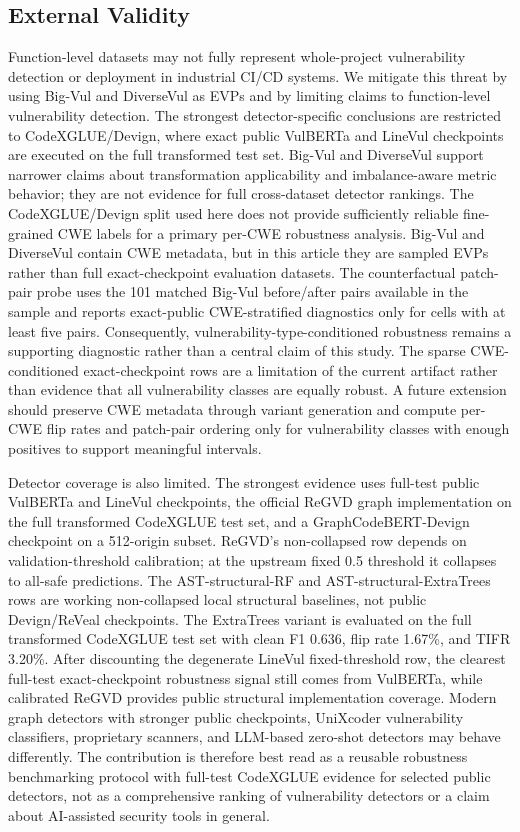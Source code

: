 \documentclass[a4paper,fleqn]{cas-dc}
\begin{document}
\subsection{External Validity}

Function-level datasets may not fully represent whole-project vulnerability
detection or deployment in industrial CI/CD systems. We mitigate this threat
by using Big-Vul and DiverseVul as EVPs and by limiting
claims to function-level vulnerability detection. The strongest
detector-specific conclusions are restricted to CodeXGLUE/Devign, where exact
public VulBERTa and LineVul checkpoints are executed on the full transformed
test set. Big-Vul and DiverseVul support narrower claims about transformation
applicability and imbalance-aware metric behavior; they are not evidence for
full cross-dataset detector rankings.
The CodeXGLUE/Devign split used here does not provide sufficiently reliable
fine-grained CWE labels for a primary per-CWE robustness analysis. Big-Vul and
DiverseVul contain CWE metadata, but in this article they are sampled EVPs rather
than full exact-checkpoint evaluation datasets. The counterfactual patch-pair
probe uses the 101 matched Big-Vul before/after pairs available in the sample
and reports exact-public CWE-stratified diagnostics only for cells with at least
five pairs. Consequently, vulnerability-type-conditioned robustness remains a
supporting diagnostic rather than a central claim of this study. The sparse
CWE-conditioned exact-checkpoint rows are a limitation of the current artifact
rather than evidence that all vulnerability classes are equally robust. A future
extension should preserve CWE metadata through variant generation and compute
per-CWE flip rates and patch-pair ordering only for vulnerability classes with
enough positives to support meaningful intervals.

Detector coverage is also limited. The strongest evidence uses full-test
public VulBERTa and LineVul checkpoints, the official ReGVD graph
implementation on the full transformed CodeXGLUE test set, and a
GraphCodeBERT-Devign checkpoint on a 512-origin subset. ReGVD's non-collapsed
row depends on validation-threshold calibration; at the upstream fixed 0.5
threshold it collapses to all-safe predictions. The AST-structural-RF and
AST-structural-ExtraTrees rows are working non-collapsed local structural
baselines, not public Devign/ReVeal checkpoints. The ExtraTrees variant is
evaluated on the full transformed CodeXGLUE test set with clean F1 0.636, flip
rate 1.67\%, and TIFR 3.20\%.
After discounting the degenerate LineVul fixed-threshold row, the clearest
full-test exact-checkpoint robustness signal still comes from VulBERTa, while
calibrated ReGVD provides public structural implementation coverage. Modern
graph detectors with stronger public checkpoints, UniXcoder vulnerability
classifiers, proprietary scanners, and LLM-based zero-shot detectors may behave
differently. The contribution is therefore best read as a reusable robustness
benchmarking protocol with full-test CodeXGLUE evidence for selected public
detectors, not as a comprehensive ranking of vulnerability detectors or a claim
about AI-assisted security tools in general.
\end{document}
